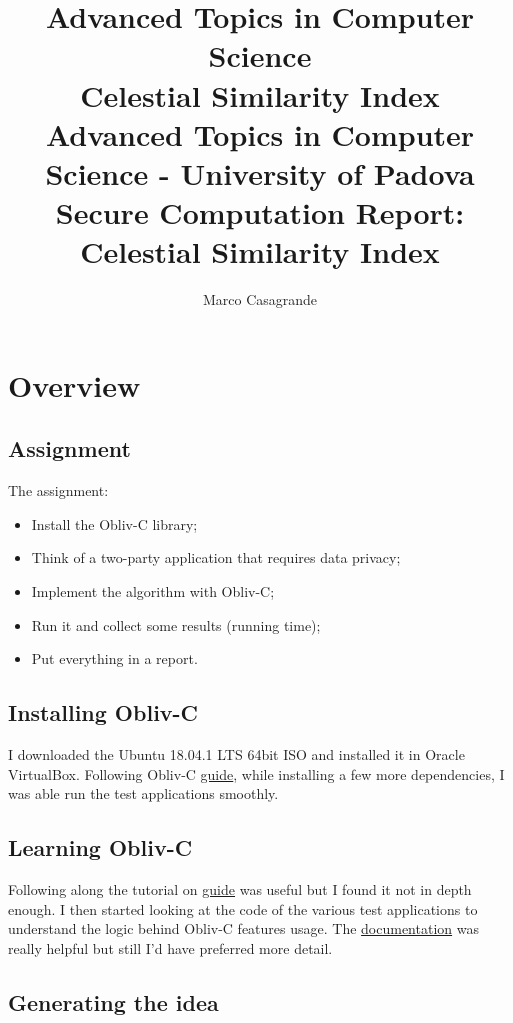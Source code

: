 \documentclass[a4paper]{article}
\title{%
  Advanced Topics in Computer Science \\
  \large Celestial Similarity Index \\ }
\title{%
  Advanced Topics in Computer Science - University of Padova \\
  \large Secure Computation Report: Celestial Similarity Index}
\author{Marco Casagrande}
\begin{document}
\maketitle

\section{Overview}

\subsection{Assignment}

The assignment:

\begin{itemize}
    \item Install the Obliv-C library;
    \item Think of a two-party application that requires data privacy;
    \item Implement the algorithm with Obliv-C;
    \item Run it and collect some results (running time);
    \item Put everything in a report.
\end{itemize}

\subsection{Installing Obliv-C}

I downloaded the Ubuntu 18.04.1 LTS 64bit ISO and installed it in Oracle VirtualBox. Following Obliv-C \href{https://oblivc.org/tutorial/}{guide}, while installing a few more dependencies, I was able run the test applications smoothly.

\subsection{Learning Obliv-C}

Following along the tutorial on \href{https://oblivc.org/tutorial/}{guide} was useful but I found it not in depth enough. I then started looking at the code of the various test applications to understand the logic behind Obliv-C features usage. The \href{https://oblivc.org/tutorial/}{documentation} was really helpful but still I'd have preferred more detail.

\subsection{Generating the idea}
\end{document}
